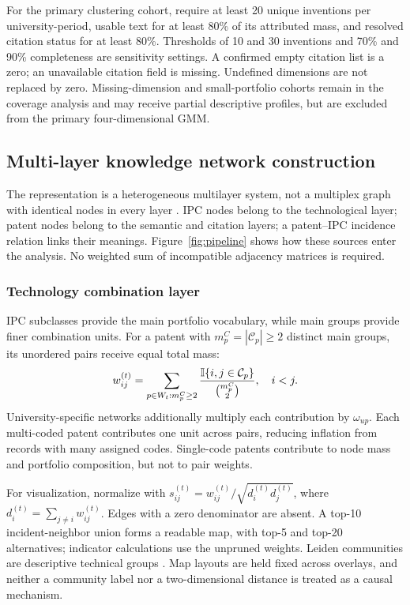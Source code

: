 For the primary clustering cohort, require at least 20 unique inventions per
university-period, usable text for at least 80\% of its attributed mass, and
resolved citation status for at least 80\%. Thresholds of 10 and 30 inventions
and 70\% and 90\% completeness are sensitivity settings. A confirmed empty
citation list is a zero; an unavailable citation field is missing. Undefined
dimensions are not replaced by zero. Missing-dimension and small-portfolio
cohorts remain in the coverage analysis and may receive partial descriptive
profiles, but are excluded from the primary four-dimensional GMM.

\subsection{Multi-layer knowledge network construction}\label{sec:networks}
The representation is a heterogeneous multilayer system, not a multiplex graph
with identical nodes in every layer \citep{kivela2014,boccaletti2014}. IPC nodes
belong to the technological layer; patent nodes belong to the semantic and citation
layers; a patent--IPC incidence relation links their meanings. Figure~\ref{fig:pipeline}
shows how these sources enter the analysis. No weighted sum of incompatible
adjacency matrices is required.



\subsubsection{Technology combination layer}
IPC subclasses provide the main portfolio vocabulary, while main groups provide
finer combination units. For a patent with $m_p^{C}=|\mathcal{C}_p|\geq2$ distinct
main groups, its unordered pairs receive equal total mass:
\begin{equation}
 w_{ij}^{(t)}=\sum_{p\in W_t:m_p^C\geq2}
 \frac{\mathbb{I}\{i,j\in\mathcal{C}_p\}}{\binom{m_p^C}{2}},\quad i<j.
 \label{eq:cooc}
\end{equation}
University-specific networks additionally multiply each contribution by
$\omega_{up}$. Each multi-coded patent contributes one unit across pairs, reducing
inflation from records with many assigned codes. Single-code patents contribute
to node mass and portfolio composition, but not to pair weights.

For visualization, normalize with
$s_{ij}^{(t)}=w_{ij}^{(t)}/\sqrt{d_i^{(t)}d_j^{(t)}}$,
where $d_i^{(t)}=\sum_{j\ne i}w_{ij}^{(t)}$.
Edges with a zero denominator are absent. A top-10 incident-neighbor union forms
a readable map, with top-5 and top-20 alternatives; indicator calculations use
the unpruned weights. Leiden communities are descriptive technical groups
\citep{traag2019}. Map layouts are held fixed across overlays, and neither a
community label nor a two-dimensional distance is treated as a causal mechanism.

